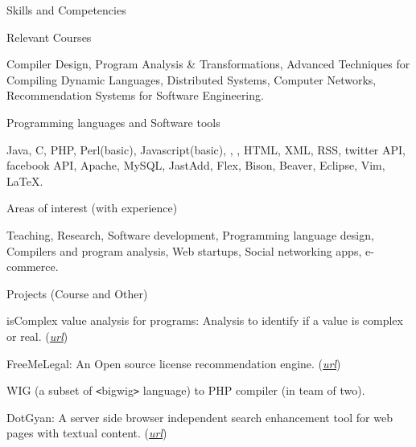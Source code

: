 \documentclass{resume} %
\begin{document}
\begin{rSection}{Skills and Competencies}
\begin{rSubsection}{Relevant Courses}{}{}{}
\item Compiler Design, Program Analysis \& Transformations, Advanced Techniques for Compiling Dynamic Languages,
Distributed Systems, Computer Networks, Recommendation Systems for Software Engineering.
\end{rSubsection}

\begin{rSubsection}{Programming languages and Software tools}{}{}{}
\item Java, C, PHP, Perl(basic), Javascript(basic), \matlab, \xten, HTML, XML, RSS, twitter API, facebook API, Apache, MySQL, JastAdd, Flex, Bison, Beaver, Eclipse, Vim, \LaTeX. 
\end{rSubsection}

\begin{rSubsection}{Areas of interest (with experience)}{}{}{}
\item Teaching, Research, Software development, Programming language design, Compilers and program analysis, Web startups, Social networking apps, e-commerce.
\end{rSubsection}
\end{rSection}



\begin{rSection}{Projects (Course and Other)}
\smallskip
\begin{lSubsection}
    \item isComplex value analysis for \matlab programs: Analysis to identify if a value is complex or real.
    (\href{https://github.com/Sable/mclab/tree/master/languages/Natlab/src/natlab/tame/valueanalysis/components/isComplex}{\em{url}}) 
    \item FreeMeLegal: An Open source license recommendation engine.
    (\href{http://vineetkumar.net/freeMeLegal/free-me-legal_final_report.pdf}{\em{url}})
    \item WIG (a subset of \verb+<+bigwig\verb+>+ language) to PHP compiler (in team of two).
    \item DotGyan: A server side browser independent search enhancement tool for web pages with textual content.
    (\href{http://vineetkumar.net/dotgyan/}{\em{url}})
\end{lSubsection}
\end{rSection}

\end{document}

